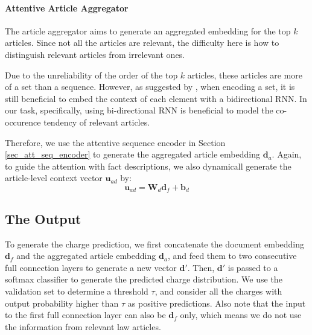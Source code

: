 \paragraph{Attentive Article Aggregator}
The article aggregator aims to generate an aggregated embedding for the top $k$ articles. Since not all the articles are relevant, the difficulty here is how to distinguish relevant articles from irrelevant ones.

Due to the unreliability of the order of the top $k$ articles, these articles are more of a set than a sequence.
However, as suggested by \cite{vinyals2016matching}, when encoding a set, it is still beneficial to embed the context of each element with a bidirectional RNN.
In our task, specifically, using bi-directional RNN is beneficial to model the co-occurence tendency of relevant articles.

Therefore, we use the attentive sequence encoder in Section \ref{sec_att_seq_encoder} to generate the aggregated article embedding $\mathbf{d}_a$. Again, to guide the attention with fact descriptions, we also dynamicall generate the article-level context vector $\mathbf{u}_{ad}$ by:
\begin{equation}
\mathbf{u}_{ad} = \mathbf{W}_d \mathbf{d}_f + \mathbf{b}_d
\end{equation}


\subsection{The Output}
To generate the charge prediction, we first concatenate the document embedding $\mathbf{d}_f$ and the aggregated article embedding $\mathbf{d}_a$, and feed them to two consecutive full connection layers to generate a new vector $\mathbf{d}'$. Then, $\mathbf{d}'$ is passed to a softmax classifier to generate the predicted charge distribution. We use the validation set to determine a threshold $\tau$, and consider all the charges with output probability higher than $\tau$ as positive predictions.
Also note that the input to the first full connection layer can also be $\mathbf{d}_f$ only, which means we do not use the information from relevant law articles.

